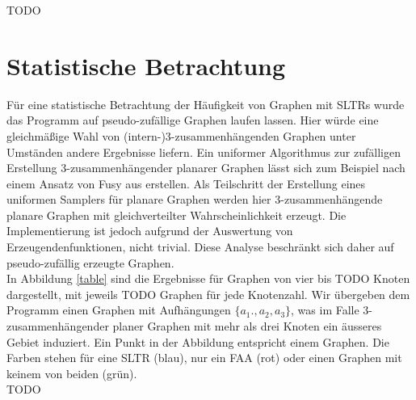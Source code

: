 TODO

\section{Statistische Betrachtung}

Für eine statistische Betrachtung der Häufigkeit von Graphen mit SLTRs wurde das Programm auf pseudo-zufällige Graphen laufen lassen. Hier würde eine gleichmäßige Wahl von (intern-)3-zusammenhängenden Graphen unter Umständen andere Ergebnisse liefern. Ein uniformer Algorithmus zur zufälligen Erstellung 3-zusammenhängender planarer Graphen lässt sich zum Beispiel nach einem Ansatz von Fusy aus \cite{fusy07} erstellen. Als Teilschritt der Erstellung eines uniformen Samplers für planare Graphen werden hier 3-zusammenhängende planare Graphen mit gleichverteilter Wahrscheinlichkeit erzeugt. Die Implementierung ist jedoch aufgrund der Auswertung von Erzeugendenfunktionen, nicht trivial. Diese Analyse beschränkt sich daher auf pseudo-zufällig erzeugte Graphen. \\

In Abbildung \ref{table} sind die Ergebnisse für Graphen von vier bis TODO Knoten dargestellt, mit jeweils TODO Graphen für jede Knotenzahl. Wir übergeben dem Programm einen Graphen mit Aufhängungen $\{a_1.,a_2,a_3\}$, was im Falle 3-zusammenhängender planer Graphen mit mehr als drei Knoten ein äusseres Gebiet induziert. Ein Punkt in der Abbildung entspricht einem Graphen. Die Farben stehen für eine SLTR (blau), nur ein FAA (rot) oder einen Graphen mit keinem von beiden (grün). \\



TODO
